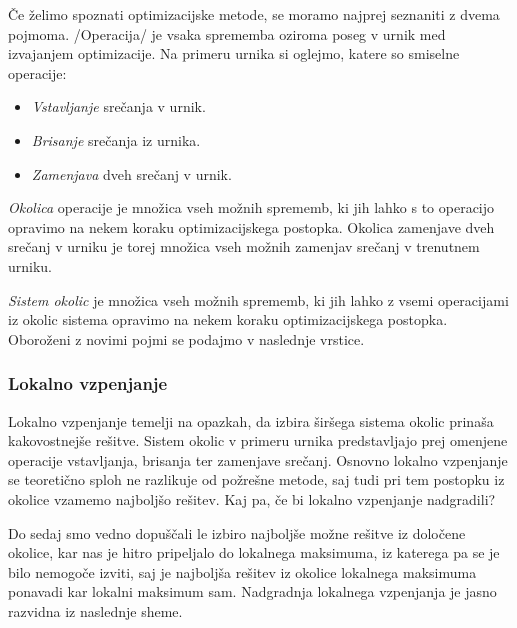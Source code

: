 \documentclass[a4paper, 10pt]{article}
\begin{document}
Če želimo spoznati optimizacijske metode, se moramo najprej seznaniti z dvema pojmoma.
/Operacija/ je vsaka sprememba oziroma poseg v urnik med izvajanjem optimizacije.
Na primeru urnika si oglejmo, katere so smiselne operacije:

\begin{itemize}
   \item \emph{Vstavljanje} srečanja v urnik.
   \item \emph{Brisanje} srečanja iz urnika.
   \item \emph{Zamenjava} dveh srečanj v urnik.
\end{itemize}

\noindent \emph{Okolica} operacije je množica vseh možnih sprememb, ki jih lahko s to operacijo
opravimo na nekem koraku optimizacijskega postopka. Okolica zamenjave dveh srečanj v urniku
je torej množica vseh možnih zamenjav srečanj v trenutnem urniku.

\emph{Sistem okolic} je množica vseh možnih sprememb, ki jih lahko z vsemi operacijami iz
okolic sistema opravimo na nekem koraku optimizacijskega postopka. Oboroženi z novimi pojmi
se podajmo v naslednje vrstice.

\subsubsection{Lokalno vzpenjanje}

Lokalno vzpenjanje temelji na opazkah, da izbira širšega sistema okolic prinaša kakovostnejše
rešitve. Sistem okolic v primeru urnika predstavljajo prej omenjene operacije vstavljanja,
brisanja ter zamenjave srečanj. Osnovno lokalno vzpenjanje se teoretično sploh ne razlikuje
od požrešne metode, saj tudi pri tem postopku iz okolice vzamemo najboljšo rešitev. Kaj pa,
če bi lokalno vzpenjanje nadgradili?

Do sedaj smo vedno dopuščali le izbiro najboljše možne rešitve iz določene okolice, kar nas
je hitro pripeljalo do lokalnega maksimuma, iz katerega pa se je bilo nemogoče izviti, saj
je najboljša rešitev iz okolice lokalnega maksimuma ponavadi kar lokalni maksimum sam.
Nadgradnja lokalnega vzpenjanja je jasno razvidna iz naslednje sheme.
\end{document}
